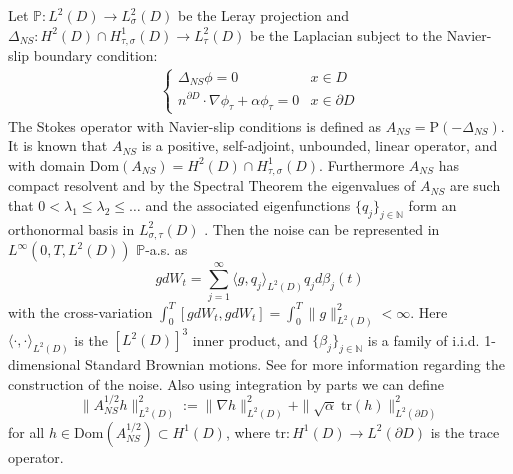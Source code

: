 \documentclass[11pt, reqno]{article}
\def\N{{\mathbb N}} %
\def\grad{\nabla}
\def\Pr{{\mathrm P}} %
\def\P{{\mathbb P}}
\def\Dom{\mathrm{Dom}}
\newcommand{\tr}[1]{\mathrm{tr}(#1)}
\begin{document}
Let $\P:L^2(D) \to L_\sigma^2(D)$ be the Leray projection and $\Delta_{NS}:H^2(D) \cap H_{\tau, \sigma}^1(D) \to L_\tau^2(D)$ be the Laplacian subject to the Navier-slip boundary condition:
\begin{align*}
    \begin{cases}
        \Delta_{NS}\phi = 0 & x \in D\\
        n^{\partial D}\cdot \grad \phi_\tau + \alpha \phi_\tau = 0 & x \in \partial D
    \end{cases}
\end{align*}
The Stokes operator with Navier-slip conditions is defined as $A_{NS} = \Pr(-\Delta_{NS})$. It is known that $A_{NS}$ is a positive, self-adjoint, unbounded, linear operator, and with domain $\Dom(A_{NS}) = H^2(D) \cap H_{\tau, \sigma}^1(D)$. Furthermore $A_{NS}$ has compact resolvent and by the Spectral Theorem the eigenvalues of $A_{NS}$ are such that $0 < \lambda_1 \leq \lambda_2 \leq \dots$ and the associated eigenfunctions $\{q_j\}_{j\in \N}$ form an orthonormal basis in $L_{\sigma, \tau}^2(D)$ \cites{chen2010study, Amrouche2021}. Then the noise can be represented in $L^\infty(0,T, L^2(D))$ $\P$-a.s. as 
\[
    gdW_t = \sum_{j=1}^\infty \langle g, q_j\rangle_{L^2(D)}q_jd\beta_j(t)
\]
with the cross-variation $\int_0^T[gdW_t, gdW_t] = \int_0^T\|g\|_{L^2(D)}^2 < \infty$. Here $\langle \cdot , \cdot \rangle_{L^2(D)}$ is the $[L^2(D)]^3$ inner product, and $\{\beta_j\}_{j \in \N}$ is a family of i.i.d. 1-dimensional Standard Brownian motions. See \cite{da2014stochastic} for more information regarding the construction of the noise. Also using integration by parts we can define
\[
    \|A_{NS}^{1/2}h\|_{L^2(D)}^2 := \|\grad h\|_{L^2(D)}^2 + \|\sqrt{\alpha}\;\tr{h}\|_{L^2(\partial D)}^2
\]
for all $h \in \Dom(A_{NS}^{1/2}) \subset H^1(D)$, where $\mathrm{tr}: H^1(D) \to L^2(\partial D)$ is the trace operator. 
\end{document}
